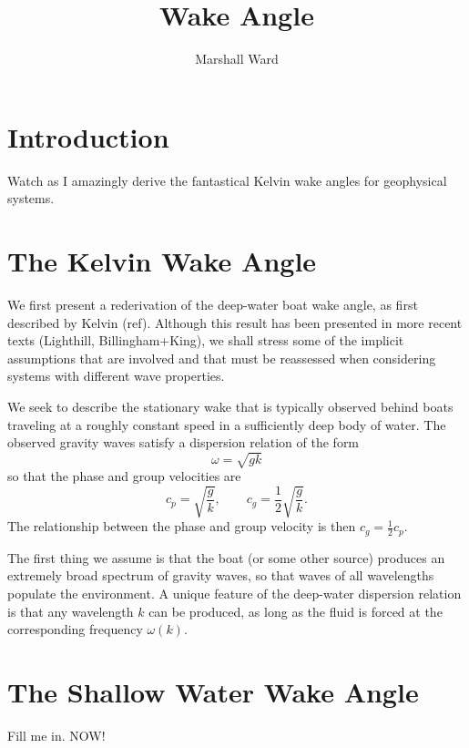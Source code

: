 \documentclass[letterpaper, 11pt]{article}
\title{Wake Angle}
\author{Marshall Ward}
\begin{document}
\maketitle


\section{Introduction}

Watch as I amazingly derive the fantastical Kelvin wake angles for geophysical systems.


\section{The Kelvin Wake Angle}

We first present a rederivation of the deep-water boat wake angle, as first described by Kelvin (ref). Although this result has been presented in more recent texts (Lighthill, Billingham+King), we shall stress some of the implicit assumptions that are involved and that must be reassessed when considering systems with different wave properties.

We seek to describe the stationary wake that is typically observed behind boats traveling at a roughly constant speed in a sufficiently deep body of water. The observed gravity waves satisfy a dispersion relation of the form
\begin{equation}
\omega = \sqrt{g k}
\end{equation}
so that the phase and group velocities are
\begin{equation}
c_p = \sqrt{\frac{g}{k}}, \qquad c_g = \frac{1}{2} \sqrt{\frac{g}{k}}.
\end{equation}
The relationship between the phase and group velocity is then $c_g = \frac{1}{2} c_p$.

The first thing we assume is that the boat (or some other source) produces an extremely broad spectrum of gravity waves, so that waves of all wavelengths populate the environment. A unique feature of the deep-water dispersion relation is that any wavelength $k$ can be produced, as long as the fluid is forced at the corresponding frequency $\omega(k)$. 


\section{The Shallow Water Wake Angle}

Fill me in. NOW!

\end{document}
